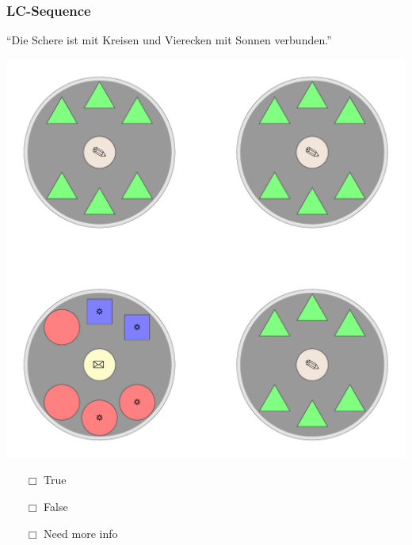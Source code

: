 \documentclass[fleqn,10pt,serif,xcolor=dvipsnames]{beamer}
\newcommand{\LC}{LC}
\newcommand{\mymark}[1]{{\color{blue}{#1}}}
\begin{document}
\begin{frame}
  \frametitle{\LC-Sequence}
  \begin{center}
    ``Die Schere ist mit Kreisen und Vierecken mit Sonnen verbunden.''

    \vspace{0.1cm}

    \includegraphics[width=0.5 \textwidth]{../../pictures/lc_01_1.pdf}

    \vspace{0.1cm}

    \begin{multicols}{3}
      \begin{itemize} 
      \item[$\Box$] True\\
        \onslide<2>{$\leadsto$  \mymark{false}}
      \item[$\Box$] False\\
        \onslide<2>{$\leadsto$ \mymark{false}}
      \item[$\Box$] Need more info 
      \end{itemize}
    \end{multicols}

  \end{center}
\end{frame}
\end{document}

